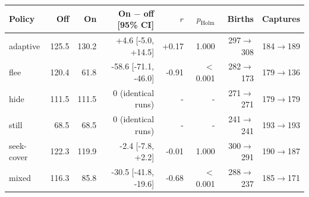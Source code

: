 \begin{tabular}{lrrrrrrr}
\toprule
Policy & Off & On & On $-$ off [95\% CI] & $r$ & $p_\mathrm{Holm}$ & Births & Captures \\
\midrule
adaptive & 125.5 & 130.2 & +4.6 [-5.0, +14.5] & +0.17 & 1.000 & 297$\to$308 & 184$\to$189 \\
flee & 120.4 & 61.8 & -58.6 [-71.1, -46.0] & -0.91 & $<$0.001 & 282$\to$173 & 179$\to$136 \\
hide & 111.5 & 111.5 & 0 (identical runs) & - & - & 271$\to$271 & 179$\to$179 \\
still & 68.5 & 68.5 & 0 (identical runs) & - & - & 241$\to$241 & 193$\to$193 \\
seek-cover & 122.3 & 119.9 & -2.4 [-7.8, +2.2] & -0.01 & 1.000 & 300$\to$291 & 190$\to$187 \\
mixed & 116.3 & 85.8 & -30.5 [-41.8, -19.6] & -0.68 & $<$0.001 & 288$\to$237 & 185$\to$171 \\
\bottomrule
\end{tabular}
